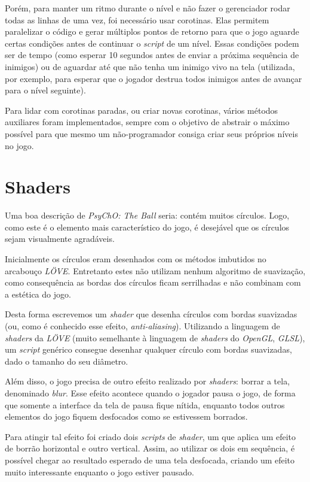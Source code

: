 Porém, para manter um ritmo durante o nível e não fazer o gerenciador rodar todas as linhas de uma vez, foi necessário usar corotinas. Elas permitem paralelizar o código e gerar múltiplos pontos de retorno para que o jogo aguarde certas condições antes de continuar o \textit{script} de um nível. Essas condições podem ser de tempo (como esperar 10 segundos antes de enviar a próxima sequência de inimigos) ou de aguardar até que não tenha um inimigo vivo na tela (utilizada, por exemplo, para esperar que o jogador destrua todos inimigos antes de avançar para o nível seguinte).

Para lidar com corotinas paradas, ou criar novas corotinas, vários métodos auxiliares foram implementados, sempre com o objetivo de abstrair o máximo possível para que mesmo um não-programador consiga criar seus próprios níveis no jogo.

\section{Shaders}
\label{sec:shaders}

Uma boa descrição de \textit{PsyChO: The Ball} seria: contém muitos círculos. Logo, como este é o elemento mais característico do jogo, é desejável que os círculos sejam visualmente agradáveis.

Inicialmente os círculos eram desenhados com os métodos imbutidos no arcabouço \textit{LÖVE}. Entretanto estes não utilizam nenhum algoritmo de suavização, como consequência as bordas dos círculos ficam serrilhadas e não combinam com a estética do jogo.

Desta forma escrevemos um \textit{shader} que desenha círculos com bordas suavizadas (ou, como é conhecido esse efeito, \textit{anti-aliasing}). Utilizando a linguagem de \textit{shaders} da \textit{LÖVE} (muito semelhante à linguagem de \textit{shaders} do \textit{OpenGL}, \textit{GLSL}), um \textit{script} genérico consegue desenhar qualquer círculo com bordas suavizadas, dado o tamanho do seu diâmetro.

Além disso, o jogo precisa de outro efeito realizado por \textit{shaders}: borrar a tela, denominado \textit{blur}. Esse efeito acontece quando o jogador pausa o jogo, de forma que somente a interface da tela de pausa fique nítida, enquanto todos outros elementos do jogo fiquem desfocados como se estivessem borrados.

Para atingir tal efeito foi criado dois \textit{scripts} de \textit{shader}, um que aplica um efeito de borrão horizontal e outro vertical. Assim, ao utilizar os dois em sequência, é possível chegar ao resultado esperado de uma tela desfocada, criando um efeito muito interessante enquanto o jogo estiver pausado.

